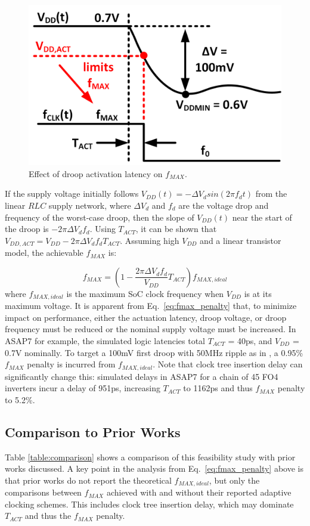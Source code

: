\documentclass[twoside,9pt,journal,letterpage]{IEEEtran}
\begin{document}
\vspace{-7pt}
\begin{figure}[h]
	\centering
	\includegraphics[width=0.6\columnwidth]{fig_drooplatency}
	\caption{Effect of droop activation latency on $f_{MAX}$.}
	\label{fig:drooplatency}
\end{figure}

If the supply voltage initially follows $V_{DD}(t) = -\Delta V_{d}sin(2\pi f_{d}t)$ from the linear $RLC$ supply network, where $\Delta V_{d}$ and $f_{d}$ are the voltage drop and frequency of the worst-case droop, then the slope of $V_{DD}(t)$ near the start of the droop is $-2\pi \Delta V_{d}f_{d}$. Using $T_{ACT}$, it can be shown that $V_{DD,ACT} = V_{DD}-2\pi \Delta V_{d}f_{d}T_{ACT}$. Assuming high $V_{DD}$ and a linear transistor model, the achievable $f_{MAX}$ is:

\begin{equation}
\label{eq:fmax_penalty}
f_{MAX} = (1 - \frac{2\pi\Delta V_{d}f_{d}}{V_{DD}}T_{ACT})f_{MAX,ideal}
\end{equation} 
where $f_{MAX,ideal}$ is the maximum SoC clock frequency when $V_{DD}$ is at its maximum voltage. It is apparent from Eq.\ \ref{eq:fmax_penalty} that, to minimize impact on performance, either the actuation latency, droop voltage, or droop frequency must be reduced or the nominal supply voltage must be increased. In ASAP7 for example, the simulated logic latencies total $T_{ACT}$ = 40ps, and $V_{DD}$ = 0.7V nominally. To target a 100mV first droop with 50MHz ripple as in \cite{hashimoto2018}, a 0.95\% $f_{MAX}$ penalty is incurred from $f_{MAX,ideal}$. Note that clock tree insertion delay can significantly change this: simulated delays in ASAP7 for a chain of 45 FO4 inverters incur a delay of 951ps, increasing $T_{ACT}$ to 1162ps and thus $f_{MAX}$ penalty to 5.2\%.

\vspace{-5pt}
\subsection{Comparison to Prior Works}
\label{sec:comp-priors}
Table \ref{table:comparison} shows a comparison of this feasibility study with prior works discussed. A key point in the analysis from Eq.\ \ref{eq:fmax_penalty} above is that prior works do not report the theoretical $f_{MAX,ideal}$, but only the comparisons between $f_{MAX}$ achieved with and without their reported adaptive clocking schemes. This includes clock tree insertion delay, which may dominate $T_{ACT}$ and thus the $f_{MAX}$ penalty.
\end{document}
